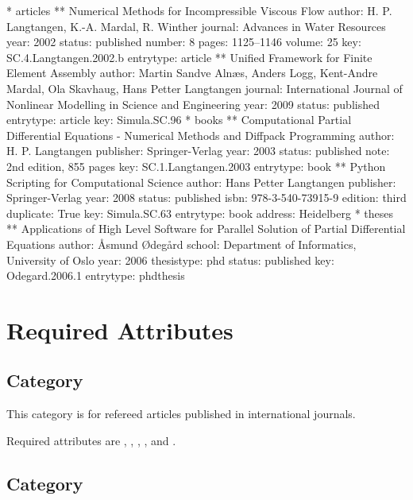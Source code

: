 \tiny
\begin{code}
* articles
** Numerical Methods for Incompressible Viscous Flow
   author:    H. P. Langtangen, K.-A. Mardal, R. Winther
   journal:   Advances in Water Resources
   year:      2002
   status:    published
   number:    8
   pages:     1125--1146
   volume:    25
   key:       SC.4.Langtangen.2002.b
   entrytype: article
** Unified Framework for Finite Element Assembly
   author:    Martin Sandve Aln{\ae}s, Anders Logg, Kent-Andre Mardal, Ola Skavhaug, Hans Petter Langtangen
   journal:   International Journal of Nonlinear Modelling in Science and Engineering
   year:      2009
   status:    published
   entrytype: article
   key:       Simula.SC.96
* books
** Computational Partial Differential Equations - Numerical Methods and Diffpack Programming
   author:    H. P. Langtangen
   publisher: Springer-Verlag
   year:      2003
   status:    published
   note:      2nd edition, 855 pages
   key:       SC.1.Langtangen.2003
   entrytype: book
** {P}ython Scripting for Computational Science
   author:    Hans Petter Langtangen
   publisher: Springer-Verlag
   year:      2008
   status:    published
   isbn:      978-3-540-73915-9
   edition:   third
   duplicate: True
   key:       Simula.SC.63
   entrytype: book
   address:   Heidelberg
* theses
** Applications of High Level Software for Parallel Solution of Partial Differential Equations
   author:     {\AA}smund {\O}deg{\aa}rd
   school:     Department of Informatics, University of Oslo
   year:       2006
   thesistype: phd
   status:     published
   key:        Odegard.2006.1
   entrytype:  phdthesis
\end{code}
\normalsize

\section{Required Attributes}

\subsection{Category }

This category is for refereed articles published in international
journals.

Required attributes are , , , , and .

\subsection{Category }

